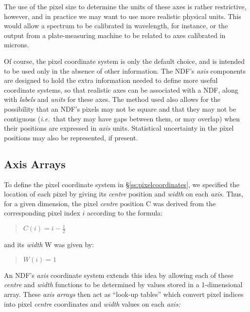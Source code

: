 \documentclass[twoside,11pt]{article}
\newcommand{\xlabel}[1]{}
\newcommand{\st}[1]{{\em{#1}}}
\begin{document}
The use of the pixel size to determine the units of these axes is rather
restrictive, however, and in practice we may want to use more realistic
physical units. 
This would allow a spectrum to be calibrated in wavelength, for instance, or
the output from a plate-measuring machine to be related to axes calibrated
in microns. 

Of course, the pixel coordinate system is only the default choice, and is 
intended to be used only in the absence of other information.
The NDF's \st{axis\/} components are designed to hold the extra information
needed to define more useful coordinate systems, so that realistic axes can
be associated with a NDF, along with \st{labels\/} and \st{units\/} for
these axes. 
The method used also allows for the possibility that an NDF's pixels may not
be square and that they may not be contiguous (\st{i.e.}\ that they may
have gaps between them, or may overlap) when their positions are expressed
in \st{axis\/} units. 
Statistical uncertainty in the pixel positions may also be represented, if 
present.

\subsection{\xlabel{axis_arrays}\label{ss:axisarrays}Axis Arrays}

To define the pixel coordinate system in \S\ref{ss:pixelcoordinates}, we
specified the location of each pixel by giving its \st{centre\/} position
and \st{width\/} on each \st{axis}. 
Thus, for a given dimension, the pixel \st{centre\/} position C was derived
from the corresponding pixel index $i$ according to the formula: 

\small
\begin{quote}
\begin{center}
$C(i)=i-\frac{1}{2}$
\end{center}
\end{quote}
\normalsize

and its \st{width\/} W was given by:

\small
\begin{quote}
\begin{center}
$W(i)=1$
\end{center}
\end{quote}
\normalsize

An NDF's \st{axis\/} coordinate system extends this idea by allowing each
of these \st{centre\/} and \st{width\/} functions to be determined by
values stored in a 1-dimensional array. 
These \st{axis arrays\/} then act as ``look-up tables'' which convert pixel
indices into pixel \st{centre\/} coordinates and \st{width\/} values on 
each \st{axis:}
\end{document}
